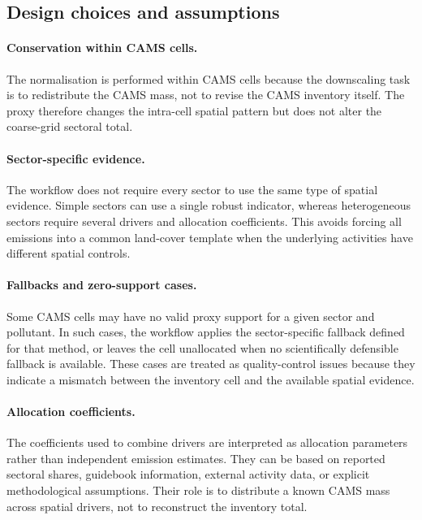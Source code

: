 \subsection{Design choices and assumptions}

\paragraph{Conservation within CAMS cells.}
The normalisation is performed within CAMS cells because the downscaling
task is to redistribute the CAMS mass, not to revise the CAMS inventory
itself. The proxy therefore changes the intra-cell spatial pattern but
does not alter the coarse-grid sectoral total.

\paragraph{Sector-specific evidence.}
The workflow does not require every sector to use the same type of
spatial evidence. Simple sectors can use a single robust indicator,
whereas heterogeneous sectors require several drivers and allocation
coefficients. This avoids forcing all emissions into a common land-cover
template when the underlying activities have different spatial controls.

\paragraph{Fallbacks and zero-support cases.}
Some CAMS cells may have no valid proxy support for a given sector and
pollutant. In such cases, the workflow applies the sector-specific
fallback defined for that method, or leaves the cell unallocated when no
scientifically defensible fallback is available. These cases are treated
as quality-control issues because they indicate a mismatch between the
inventory cell and the available spatial evidence.

\paragraph{Allocation coefficients.}
The coefficients used to combine drivers are interpreted as allocation
parameters rather than independent emission estimates. They can be based
on reported sectoral shares, guidebook information, external activity
data, or explicit methodological assumptions. Their role is to distribute
a known CAMS mass across spatial drivers, not to reconstruct the
inventory total.